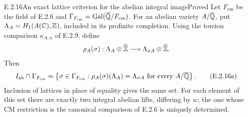 \begin{result}{E.2.16}{An exact lattice criterion for the abelian integral image}{Proved}
Let \(F_{\mathrm{cm}}\) be the field of E.2.6 and
\(\Gamma_{F_{\mathrm{cm}}}=\operatorname{Gal}(\overline{\mathbb Q}/F_{\mathrm{cm}})\).
For an abelian variety \(A/\overline{\mathbb Q}\), put
\(\Lambda_A=H_1(A(\mathbb C),\mathbb Z)\), included in its profinite
completion. Using the torsion comparison \(\kappa_{A,n}\)
of E.2.9, define
\[
 \rho_A(\sigma):
 \Lambda_A\otimes\widehat{\mathbb Z}
 \longrightarrow\Lambda_{\sigma A}\otimes\widehat{\mathbb Z} .
\]
Then
\[
 I_{\mathrm{ab}}\cap\Gamma_{F_{\mathrm{cm}}}
 =
 \left\{\sigma\in\Gamma_{F_{\mathrm{cm}}}:
   \rho_A(\sigma)(\Lambda_A)=\Lambda_{\sigma A}
   \text{ for every }A/\overline{\mathbb Q}\right\}.
 \tag{E.2.16a}
\]
Inclusion of lattices in place of equality gives the same set.
For each element of this set there are exactly two integral
abelian lifts, differing by \(w\); the one whose CM restriction
is the canonical comparison of E.2.6 is uniquely determined.
\end{result}
